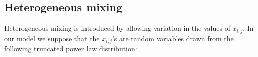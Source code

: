 \documentclass[10pt]{article}
\begin{document}
\begin{multicols}{2}

\subsection{Heterogeneous mixing}
Heterogeneous mixing is introduced by allowing variation in the values of $x_{i,j}$. In our model we suppose that the $x_{i,j}$'s are random variables drawn from the following truncated power law distribution:



\end{multicols}
\end{document}
